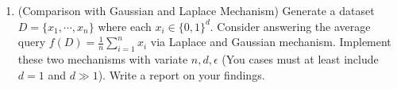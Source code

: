 \documentclass[11pt]{article}
\begin{document}
\begin{enumerate}
\item (Comparison with Gaussian and Laplace Mechanism) Generate a dataset $D=\{x_1, \cdots, x_n\}$ where each $x_i\in \{0, 1\}^d$. Consider answering the average query $f(D)=\frac{1}{n}\sum_{i=1}^n x_i$ via Laplace and Gaussian mechanism. Implement these two mechanisms with variate $n, d, \epsilon$ (You cases must at least include $d=1$ and $d\gg 1$). Write a report on your findings.  
\end{enumerate}
\end{document}
